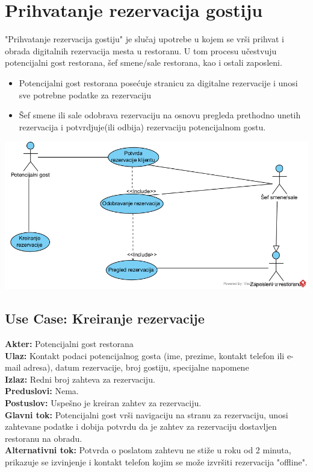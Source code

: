 \documentclass{article}
\begin{document}
\section{Prihvatanje rezervacija gostiju}
"Prihvatanje rezervacija gostiju" je slučaj upotrebe u kojem se vrši prihvat i obrada digitalnih rezervacija mesta u restoranu. U tom procesu učestvuju potencijalni gost restorana, šef smene/sale restorana, kao i ostali zaposleni.

\begin{itemize}
\item Potencijalni gost restorana posećuje stranicu za digitalne rezervacije i unosi sve potrebne podatke za rezervaciju
\item Šef smene ili sale odobrava rezervaciju na osnovu pregleda prethodno unetih rezervacija i potvrdjuje(ili odbija) rezervaciju potencijalnom gostu.
\end{itemize}
\vspace{1cm}
\includegraphics[width=\textwidth]{PrihvatanjeRezervacijaGostiju.png}

\subsection{\textbf{Use Case}: Kreiranje rezervacije}
\textbf{Akter:} Potencijalni gost restorana\\
\textbf{Ulaz:} Kontakt podaci potencijalnog gosta (ime, prezime, kontakt telefon ili e-mail adresa), datum rezervacije, broj gostiju, specijalne napomene\\
\textbf{Izlaz:} Redni broj zahteva za rezervaciju.\\
\textbf{Preduslovi:} Nema.\\
\textbf{Postuslov:} Uspešno je kreiran zahtev za rezervaciju.\\
\textbf{Glavni tok:} Potencijalni gost vrši navigaciju na stranu za rezervaciju, unosi zahtevane podatke i dobija potvrdu da je zahtev za rezervaciju dostavljen restoranu na obradu.\\
\textbf{Alternativni tok:} Potvrda o poslatom zahtevu ne stiže u roku od 2 minuta, prikazuje se izvinjenje i kontakt telefon kojim se može izvršiti rezervacija "offline".\\
\end{document}
